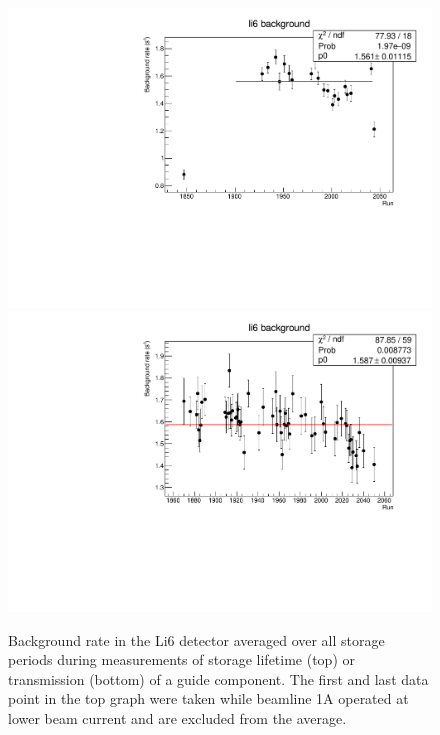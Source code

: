 \documentclass[10pt,letterpaper]{article}
\begin{document}
\begin{figure}
\centering
\includegraphics[width=\textwidth]{../storagelifetime_with_monitor/li6_background.pdf}
\includegraphics[width=\textwidth]{../transmission_with_prestorage/li6_background.pdf}
\caption{Background rate in the Li6 detector averaged over all storage periods during measurements of storage lifetime (top) or transmission (bottom) of a guide component. The first and last data point in the top graph were taken while beamline 1A operated at lower beam current and are excluded from the average.}
\label{fig:background2}
\end{figure}
\end{document}
